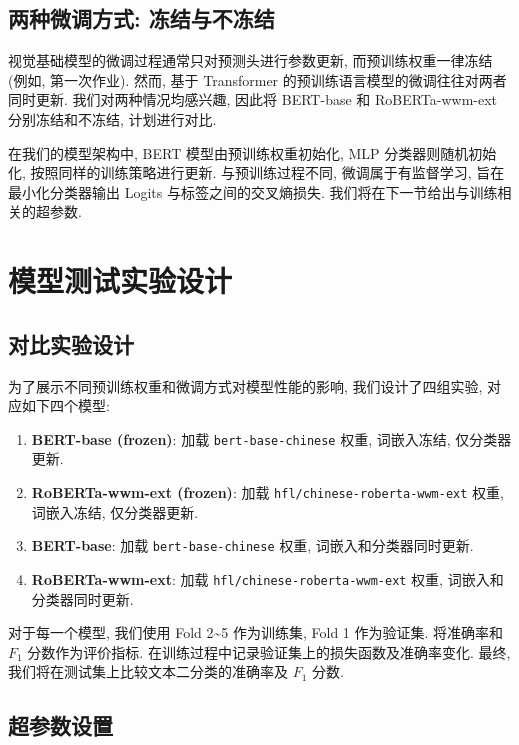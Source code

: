 \documentclass[12pt,a4paper]{article}
\begin{document}
\subsection{两种微调方式: 冻结与不冻结}

视觉基础模型的微调过程通常只对预测头进行参数更新, 而预训练权重一律冻结 (例如, 第一次作业). 然而, 基于 Transformer 的预训练语言模型的微调往往对两者同时更新. 我们对两种情况均感兴趣, 因此将 BERT-base 和 RoBERTa-wwm-ext 分别冻结和不冻结, 计划进行对比.

在我们的模型架构中, BERT 模型由预训练权重初始化, MLP 分类器则随机初始化, 按照同样的训练策略进行更新. 与预训练过程不同, 微调属于有监督学习, 旨在最小化分类器输出 Logits 与标签之间的交叉熵损失. 我们将在下一节给出与训练相关的超参数.

\section{模型测试实验设计}

\subsection{对比实验设计}

为了展示不同预训练权重和微调方式对模型性能的影响, 我们设计了四组实验, 对应如下四个模型:

\begin{enumerate}[noitemsep,topsep=0pt,parsep=0pt]
    \item \textbf{BERT-base (frozen)}: 加载 \texttt{bert-base-chinese} 权重, 词嵌入冻结, 仅分类器更新.
    \item \textbf{RoBERTa-wwm-ext (frozen)}: 加载 \texttt{hfl/chinese-roberta-wwm-ext} 权重, 词嵌入冻结, 仅分类器更新.
    \item \textbf{BERT-base}: 加载 \texttt{bert-base-chinese} 权重, 词嵌入和分类器同时更新.
    \item \textbf{RoBERTa-wwm-ext}: 加载 \texttt{hfl/chinese-roberta-wwm-ext} 权重, 词嵌入和分类器同时更新.
\end{enumerate}

对于每一个模型, 我们使用 Fold 2\textasciitilde 5 作为训练集, Fold 1 作为验证集. 将准确率和 $F_1$ 分数作为评价指标. 在训练过程中记录验证集上的损失函数及准确率变化. 最终, 我们将在测试集上比较文本二分类的准确率及 $F_1$ 分数.

\subsection{超参数设置}
\end{document}
